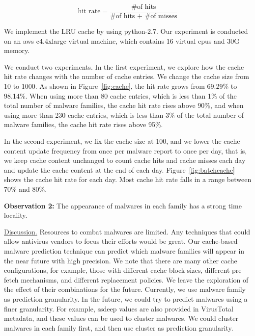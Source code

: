 $$ \mbox{hit rate} = \dfrac{\mbox{\# of hits}}{\mbox{\# of hits + \# of misses}}$$



We implement the LRU cache by using
python-2.7. Our experiment is conducted on an aws c4.4xlarge virtual machine, 
which contains 16 virtual cpus and 30G memory.

We conduct two experiments. In the first experiment, 
we explore how the cache hit rate changes with the number of cache entries. 
We change the cache size from 10 to 1000. As shown in Figure~\ref{fig:cache}, 
the hit rate grows from 69.29\% to 98.14\%. 
When using more than 80 cache entries, which is less than 1\% of the total number of malware families, the cache hit rate rises above 90\%, 
and when using more than 230 cache entries, which is less than 3\% of the total number of malware families, 
the cache hit rate rises above 95\%. 

In the second experiment, we fix the cache size at 100, 
and we lower the cache content update frequency from once per malware report to once per day, 
that is, we keep cache content unchanged to count cache hits and cache misses each day and update the cache content at the end of each day.
Figure~\ref{fig:batchcache} shows the cache hit rate for each day. 
Most cache hit rate falls in a range between 70\% and 80\%.  


{\bf Observation 2:} 
The appearance of malwares in each family has a strong time locality.  

\underline{Discussion.}
Resources to combat malwares are limited. 
Any techniques that could allow antivirus vendors to focus their efforts would be great. 
Our cache-based malware prediction technique can predict which malware families will appear in the near future with high precision. 
We note that there are many other cache configurations, for example, those
with different cache block sizes, different pre-fetch mechanisms, 
and different replacement policies. 
We leave the exploration of the effect of their combinations for the future. 
Currently, we use malware family as prediction granularity. 
In the future, we could try to predict malwares using a finer granularity. 
For example, ssdeep values are also provided in VirusTotal metadata, 
and these values can be used to cluster malwares. 
We could cluster malwares in each family first, and then use cluster as prediction granularity. 
